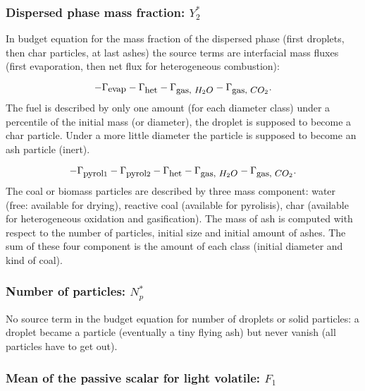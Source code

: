 \subsubsection{Dispersed phase mass fraction: $Y_{2}^{*}$}

In budget equation for the mass fraction of the dispersed phase (first droplets,
then char particles, at last ashes) the source terms are interfacial mass fluxes
(first evaporation, then net flux for heterogeneous combustion):

\begin{equation}
     -\Gamma_{\mbox{\small evap}}-\Gamma_{\mbox{\small het}}-\Gamma_{\mbox{\small gas, $H_{2}O$}}-\Gamma_{\mbox{\small gas, $CO_2$}}.
\end{equation}
The fuel is described by only one amount (for each diameter class) under a
percentile of the initial mass (or diameter), the droplet is supposed to become
a char particle. Under a more little diameter the particle is supposed to become
an ash particle (inert).

\begin{equation}
     -\Gamma_{\mbox{\small pyrol}1}-\Gamma_{\mbox{\small pyrol}2}-\Gamma_{\mbox{\small het}}-\Gamma_{\mbox{\small gas, $H_{2}O$}}-\Gamma_{\mbox{\small gas, $CO_2$}}.
\end{equation}
The coal or biomass particles are described by three mass component: water
(free: available for drying), reactive coal (available for pyrolisis), char
(available for heterogeneous oxidation and gasification). The mass of ash is
computed with respect to the number of particles, initial size and initial
amount of ashes. The sum of these four component is the amount of each class
(initial diameter and kind of coal).

\subsubsection{Number of particles: $N_{p}^{*}$}
No source term in the budget equation for number of droplets or solid particles: a droplet became a particle (eventually a tiny flying ash) but never vanish
(all particles have to get out).


\subsubsection{Mean of the passive scalar for light volatile: $F_{1}$}

